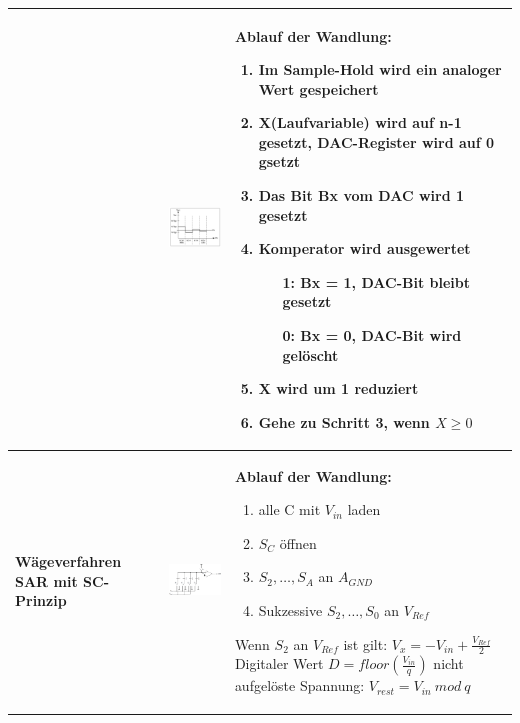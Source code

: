 \begin{longtable}{|>{\bfseries}p{4cm}|p{6cm}|p{8cm}|}
    &
    \includegraphics[width=6cm, valign=t]{pictures/prinzip_SAR.png} &
    \textbf{Ablauf der Wandlung:}
    \begin{enumerate}
      \item Im Sample-Hold wird ein analoger Wert gespeichert
      \item X(Laufvariable) wird auf n-1 gesetzt, DAC-Register wird auf 0 gsetzt
      \item Das Bit Bx vom DAC wird 1 gesetzt
      \item Komperator wird ausgewertet
            \begin{itemize}
              \item[1:] Bx = 1, DAC-Bit bleibt gesetzt
              \item[0:] Bx = 0, DAC-Bit wird gelöscht
            \end{itemize}
      \item X wird um 1 reduziert
      \item Gehe zu Schritt 3, wenn $X \geq 0$ 
    \end{enumerate} \\
  \hline
    Wägeverfahren SAR mit SC-Prinzip &
    \includegraphics[width=6cm, valign=t]{pictures/waegeverfahrenSC} &
    \textbf{Ablauf der Wandlung:}
    \begin{enumerate}
      \item alle C mit $V_{in}$ laden
      \item $S_C$ öffnen
      \item $S_2, \ldots, S_A$ an $A_{GND}$
      \item Sukzessive $S_2, \ldots, S_0$ an $V_{Ref}$
    \end{enumerate}
    Wenn $S_2$ an $V_{Ref}$ ist gilt: $V_x = -V_{in}+\frac{V_{Ref}}{2}$ \newline
    Digitaler Wert $D = floor\left( \frac{V_{in}}{q}\right)$ \newline
    nicht aufgelöste Spannung: $V_{rest} = V_{in} \ mod \ q$\\
  \hline
\end{longtable}


